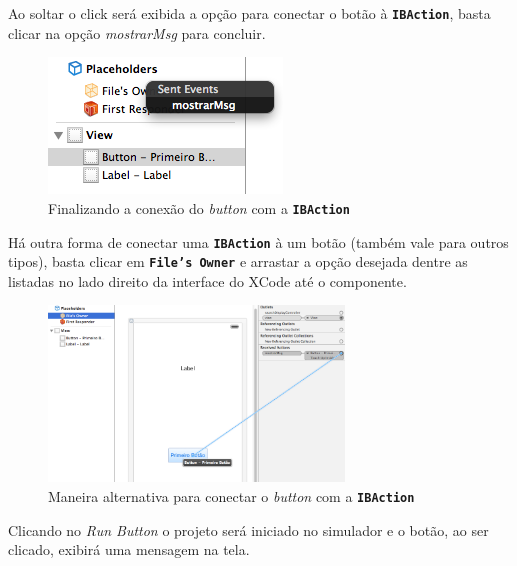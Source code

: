 \documentclass[a4paper,12pt,brazil,doubleside]{book}
\begin{document}
\begin{singlespace}
Ao soltar o click será exibida a opção para conectar o botão à \texttt{\textbf{IBAction}}, basta clicar na opção \emph{mostrarMsg} para concluir.

\begin{figure}[H]
  \centering
  \includegraphics[scale=1]{figuras/3/tela_novo_projeto_24.png}
  \caption{Finalizando a conexão do \emph{button} com a \texttt{\textbf{IBAction}}}
  \label{fig:a}
\end{figure}

Há outra forma de conectar uma \texttt{\textbf{IBAction}} à um botão (também vale para outros tipos), basta clicar em \texttt{\textbf{File's Owner}} e arrastar a opção desejada dentre as listadas no lado direito da interface do XCode até o componente.

\begin{figure}[H]
  \centering
  \includegraphics[width=0.7\textwidth]{figuras/3/tela_novo_projeto_52.png}
  \caption{Maneira alternativa para conectar o \emph{button} com a \texttt{\textbf{IBAction}}}
  \label{fig:a}
\end{figure}

Clicando no \emph{Run Button} o projeto será iniciado no simulador e o botão, ao ser clicado, exibirá uma mensagem na tela.


\end{singlespace}
\end{document}
